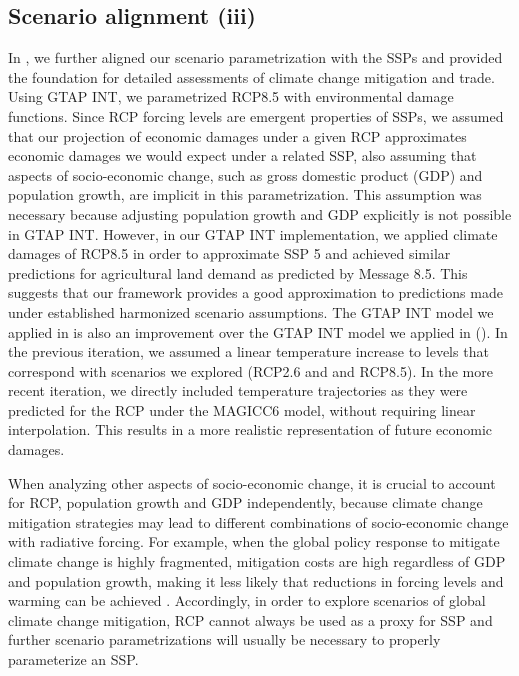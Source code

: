 \documentclass[titlesmallcaps,copyrightpage]{uomthesis}\usepackage[]{graphicx}\usepackage[]{color}
\begin{document}
\subsection{Scenario alignment (iii)}
In , we further aligned our scenario parametrization with the SSPs \citep{oneill_new_2014} and provided the foundation for detailed assessments of climate change mitigation and trade. Using GTAP INT, we parametrized RCP8.5 with environmental damage functions. Since RCP forcing levels are emergent properties of SSPs, we assumed that our projection of economic damages under a given RCP approximates economic damages we would expect under a related SSP, also assuming that aspects of socio-economic change, such as gross domestic product (GDP) and population growth, are implicit in this parametrization. This assumption was necessary because adjusting population growth and GDP explicitly is not possible in GTAP INT. However, in our GTAP INT implementation, we applied climate damages of RCP8.5 in order to approximate SSP 5 and achieved similar predictions for agricultural land demand as predicted by Message 8.5. This suggests that our framework provides a good approximation to predictions made under established harmonized scenario assumptions. The GTAP INT model we applied in  is also an improvement over the GTAP INT model we applied in \citet{kapitza_assessing_2021} (). In the previous iteration, we assumed a linear temperature increase to levels that correspond with scenarios we explored (RCP2.6 and and RCP8.5). In the more recent iteration, we directly included temperature trajectories as they were predicted for the RCP under the MAGICC6 model, without requiring linear interpolation. This results in a more realistic representation of future economic damages.

When analyzing other aspects of socio-economic change, it is crucial to account for RCP, population growth and GDP independently, because climate change mitigation strategies may lead to different combinations of socio-economic change with radiative forcing. For example, when the global policy response to mitigate climate change is highly fragmented, mitigation costs are high regardless of GDP and population growth, making it less likely that reductions in forcing levels and warming can be achieved \citep{kriegler_fossil-fueled_2017}. Accordingly, in order to explore scenarios of global climate change mitigation, RCP cannot always be used as a proxy for SSP and further scenario parametrizations will usually be necessary to properly parameterize an SSP.
\end{document}
